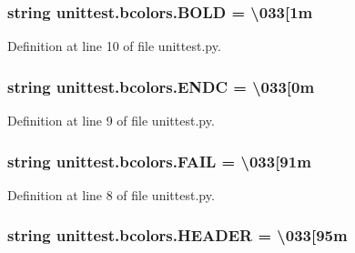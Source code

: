 \subsubsection[{\texorpdfstring{B\+O\+LD}{BOLD}}]{\setlength{\rightskip}{0pt plus 5cm}string unittest.\+bcolors.\+B\+O\+LD = \textquotesingle{}\textbackslash{}033\mbox{[}1m\textquotesingle{}\hspace{0.3cm}{\ttfamily [static]}}\hypertarget{classunittest_1_1bcolors_a95b491580216e848b313b0918ccea7ea}{}\label{classunittest_1_1bcolors_a95b491580216e848b313b0918ccea7ea}


Definition at line 10 of file unittest.\+py.

\subsubsection[{\texorpdfstring{E\+N\+DC}{ENDC}}]{\setlength{\rightskip}{0pt plus 5cm}string unittest.\+bcolors.\+E\+N\+DC = \textquotesingle{}\textbackslash{}033\mbox{[}0m\textquotesingle{}\hspace{0.3cm}{\ttfamily [static]}}\hypertarget{classunittest_1_1bcolors_a5db993c726eedb06b4a7efab09551f4e}{}\label{classunittest_1_1bcolors_a5db993c726eedb06b4a7efab09551f4e}


Definition at line 9 of file unittest.\+py.

\subsubsection[{\texorpdfstring{F\+A\+IL}{FAIL}}]{\setlength{\rightskip}{0pt plus 5cm}string unittest.\+bcolors.\+F\+A\+IL = \textquotesingle{}\textbackslash{}033\mbox{[}91m\textquotesingle{}\hspace{0.3cm}{\ttfamily [static]}}\hypertarget{classunittest_1_1bcolors_a2dada3141c1e833e5a3cacd4f39dcf47}{}\label{classunittest_1_1bcolors_a2dada3141c1e833e5a3cacd4f39dcf47}


Definition at line 8 of file unittest.\+py.

\subsubsection[{\texorpdfstring{H\+E\+A\+D\+ER}{HEADER}}]{\setlength{\rightskip}{0pt plus 5cm}string unittest.\+bcolors.\+H\+E\+A\+D\+ER = \textquotesingle{}\textbackslash{}033\mbox{[}95m\textquotesingle{}\hspace{0.3cm}{\ttfamily [static]}}\hypertarget{classunittest_1_1bcolors_a0e8ae760e5f682550fc0b4e5638c47d0}{}\label{classunittest_1_1bcolors_a0e8ae760e5f682550fc0b4e5638c47d0}


